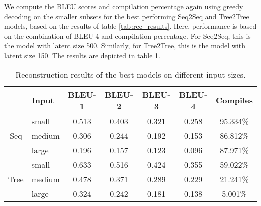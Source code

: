 

We compute the BLEU scores and compilation percentage again using greedy decoding on the smaller subsets for the best performing Seq2Seq and Tree2Tree models, based on the results of table \ref{tab:rec_results}. Here, performance is based on the combination of BLEU-4 and compilation percentage. For Seq2Seq, this is the model with latent size 500. Similarly, for Tree2Tree, this is the model with latent size 150. The results are depicted in table \ref{tab:rec_results_inp_sizes}.






\begin{table}[ht!]
\centering
\begingroup
\setlength{\tabcolsep}{3pt} %
\renewcommand{\arraystretch}{1.4} %
\begin{tabular}{clccccc}
 & \textbf{Input} & \textbf{BLEU-1} & \textbf{BLEU-2} & \textbf{BLEU-3} & \textbf{BLEU-4} & \textbf{Compiles}\\ \hline
\multirow{3}{*}{Seq}    &   small   &   0.513  &    0.403    &      0.321    &  0.258      &  95.334\%     \\
                            &   medium   &  0.306      &    0.244        &      0.192     & 0.153      & 86.812\% \\
                            &   large   &    0.196   &      0.157   &   0.123       &   0.096       &  87.971\% \\ \hline
\multirow{3}{*}{Tree}  &   small   &   0.633  &    0.516     &     0.424     &     0.355      &  59.022\%                \\
                            &   medium   &   0.478  &   0.371        &          0.289 &     0.229   & 21.241\%            \\
                            &   large   &  0.324 &      0.242  & 0.181    &    0.138     &    5.001\%         \\ 
\end{tabular}
\endgroup
\caption{Reconstruction results of the best models on different input sizes.}
\label{tab:rec_results_inp_sizes}
\end{table}



